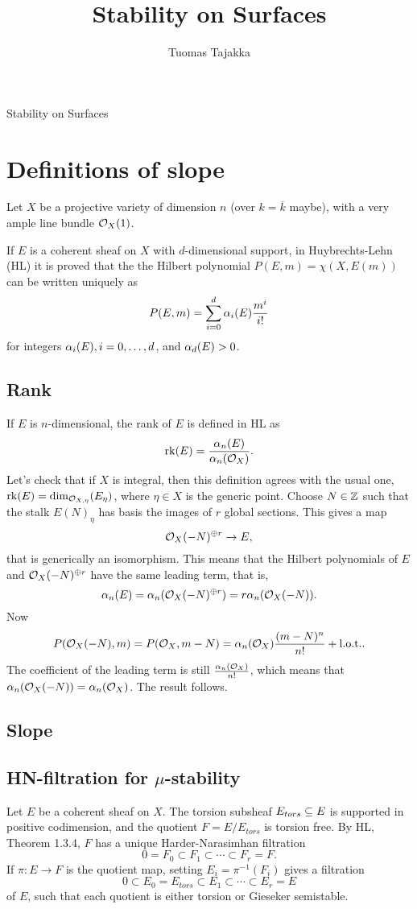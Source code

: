 \documentclass[letterpaper,10pt]{article}
\title{Stability on Surfaces}
\author{Tuomas Tajakka}
\date{}
\begin{document}
\begin{center}
    \LARGE{Stability on Surfaces}
\end{center}

\section{Definitions of slope}
Let $X$ be a projective variety of dimension $n$ (over $k = \overline{k}$ maybe), with a very ample line bundle $\mathcal{O}_X(1)$.

If $E$ is a coherent sheaf on $X$ with $d$-dimensional support, in Huybrechts-Lehn (HL) it is proved that the the Hilbert polynomial $P(E, m) = \chi(X, E(m))$ can be written uniquely as
\[ P(E, m) = \sum_{i=0}^d \alpha_i(E) \frac{m^i}{i!} \]
for integers $\alpha_i(E), i = 0, \ldots, d$, and $\alpha_d(E) > 0$.  

\subsection{Rank}
If $E$ is $n$-dimensional, the rank of $E$ is defined in HL as
\[ \operatorname{\mathrm{rk}}(E) = \frac{\alpha_n(E)}{\alpha_n(\mathcal{O}_X)}. \]
Let's check that if $X$ is integral, then this definition agrees with the usual one, $\operatorname{\mathrm{rk}}(E) = \dim_{\mathcal{O}_{X,\eta}}(E_\eta)$, where $\eta \in X$ is the generic point. Choose $N \in \mathbb{Z}$ such that the stalk $E(N)_\eta$ has basis the images of $r$ global sections. This gives a map
\[ \mathcal{O}_X(-N)^{\oplus r} \to E, \]
that is generically an isomorphism. This means that the Hilbert polynomials of $E$ and $\mathcal{O}_X(-N)^{\oplus r}$ have the same leading term, that is,
\[ \alpha_n(E) = \alpha_n(\mathcal{O}_X(-N)^{\oplus r}) = r \alpha_n(\mathcal{O}_X(-N)). \]
Now
\[ P(\mathcal{O}_X(-N), m) = P(\mathcal{O}_X, m - N) = \alpha_n(\mathcal{O}_X) \frac{(m-N)^n}{n!} + \mathrm{l.o.t.}. \]
The coefficient of the leading term is still $\frac{\alpha_n(\mathcal{O}_X)}{n!}$, which means that $\alpha_n(\mathcal{O}_X(-N)) = \alpha_n(\mathcal{O}_X)$. The result follows.

\subsection{Slope}


\subsection{HN-filtration for $\mu$-stability}
Let $E$ be a coherent sheaf on $X$. The torsion subsheaf $E_{tors} \subseteq E$ is supported in positive codimension, and the quotient $F = E/E_{tors}$ is torsion free. By HL, Theorem 1.3.4, $F$ has a unique Harder-Narasimhan filtration
\[ 0 = F_0 \subset F_1 \subset \cdots \subset F_r = F. \]
If $\pi: E \to F$ is the quotient map, setting $E_i = \pi^{-1}(F_i)$ gives a filtration
\[ 0 \subset E_0 = E_{tors} \subset E_1 \subset \cdots \subset E_r = E \]
of $E$, such that each quotient is either torsion or Gieseker semistable. 
\end{document}
